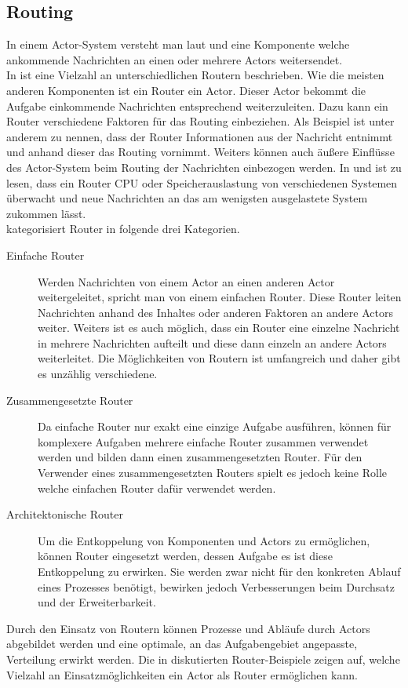 \subsection{Routing}\label{sec:actor:patterns:routing}
In einem Actor-System versteht man laut \cite{Vernon2015ReactiveAkka} und \cite{kuhn2017reactive} eine Komponente welche ankommende Nachrichten an einen oder mehrere Actors weitersendet. \\
In \cite{Vernon2015ReactiveAkka} ist eine Vielzahl an unterschiedlichen Routern beschrieben. Wie die meisten anderen Komponenten ist ein Router ein Actor. Dieser Actor bekommt die Aufgabe einkommende Nachrichten entsprechend weiterzuleiten. Dazu kann ein Router verschiedene Faktoren für das Routing einbeziehen. Als Beispiel ist unter anderem zu nennen, dass der Router Informationen aus der Nachricht entnimmt und anhand dieser das Routing vornimmt. Weiters können auch äußere Einflüsse des Actor-System beim Routing der Nachrichten einbezogen werden. In \cite{Vernon2015ReactiveAkka} und \cite{Akka.NETCommunityAkka.NETDocumentation} ist zu lesen, dass ein Router CPU oder Speicherauslastung von verschiedenen Systemen überwacht und neue Nachrichten an das am wenigsten ausgelastete System zukommen lässt. \\
\cite{Vernon2015ReactiveAkka} kategorisiert Router in folgende drei Kategorien. 
\begin{description}
  \item[Einfache Router] Werden Nachrichten von einem Actor an einen anderen Actor weitergeleitet, spricht man von einem einfachen Router. Diese Router leiten Nachrichten anhand des Inhaltes oder anderen Faktoren an andere Actors weiter. Weiters ist es auch möglich, dass ein Router eine einzelne Nachricht in mehrere Nachrichten aufteilt und diese dann einzeln an andere Actors weiterleitet. Die Möglichkeiten von Routern ist umfangreich und daher gibt es unzählig verschiedene.
  \item[Zusammengesetzte Router] Da einfache Router nur exakt eine einzige Aufgabe ausführen, können für komplexere Aufgaben mehrere einfache Router zusammen verwendet werden und bilden dann einen zusammengesetzten Router. Für den Verwender eines zusammengesetzten Routers spielt es jedoch keine Rolle welche einfachen Router dafür verwendet werden.
  \item[Architektonische Router] Um die Entkoppelung von Komponenten und Actors zu ermöglichen, können Router eingesetzt werden, dessen Aufgabe es ist diese Entkoppelung zu erwirken. Sie werden zwar nicht für den konkreten Ablauf eines Prozesses benötigt, bewirken jedoch Verbesserungen beim Durchsatz und der Erweiterbarkeit. 
\end{description}
Durch den Einsatz von Routern können Prozesse und Abläufe durch Actors abgebildet werden und eine optimale, an das Aufgabengebiet angepasste, Verteilung erwirkt werden. Die in \cite{Vernon2015ReactiveAkka} diskutierten Router-Beispiele zeigen auf, welche Vielzahl an Einsatzmöglichkeiten ein Actor als Router ermöglichen kann. 

